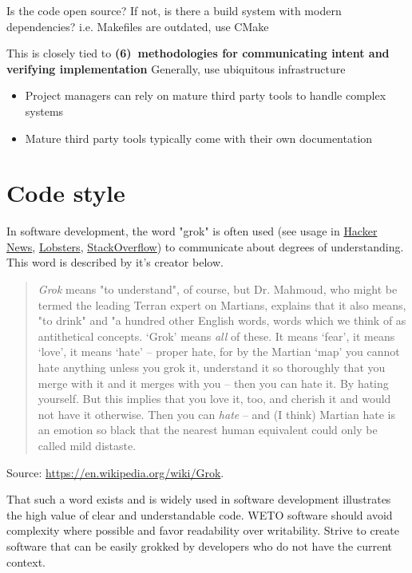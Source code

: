 \documentclass[]{nrel}
\begin{document}
Is the code open source?
If not, is there a build system with modern dependencies?
i.e. Makefiles are outdated, use CMake



This is closely tied to \textbf{(6) methodologies for communicating intent and verifying implementation}
Generally, use ubiquitous infrastructure
\begin{itemize}
\item Project managers can rely on mature third party tools to handle complex systems

\item Mature third party tools typically come with their own documentation

\end{itemize}


\section{Code style}
In software development, the word "grok" is often used (see usage in
\href{https://hn.algolia.com/?q=grok}{Hacker News},
\href{https://lobste.rs/search?q=grok\&what=stories\&order=newest}{Lobsters},
\href{https://stackoverflow.com/search?tab=newest\&q=grok\&searchOn=3}{StackOverflow})
to communicate about degrees of understanding. This word is described by it’s creator below.
\begin{quote}

\textit{Grok} means "to understand", of course, but Dr. Mahmoud, who might be termed the leading
Terran expert on Martians, explains that it also means, "to drink" and "a hundred other
English words, words which we think of as antithetical concepts. ‘Grok’ means \textit{all} of
these. It means ‘fear’, it means ‘love’, it means ‘hate’ – proper hate, for by the Martian
‘map’ you cannot hate anything unless you grok it, understand it so thoroughly that you
merge with it and it merges with you – then you can hate it. By hating yourself. But this
implies that you love it, too, and cherish it and would not have it otherwise. Then you
can \textit{hate} – and (I think) Martian hate is an emotion so black that the nearest human
equivalent could only be called mild distaste.
\end{quote}

Source: \url{https://en.wikipedia.org/wiki/Grok}.

That such a word exists and is widely used in software development illustrates the high value
of clear and understandable code.
WETO software should avoid complexity where possible and favor readability over writability.
Strive to create software that can be easily grokked by developers who do not have the current
context.
\end{document}
